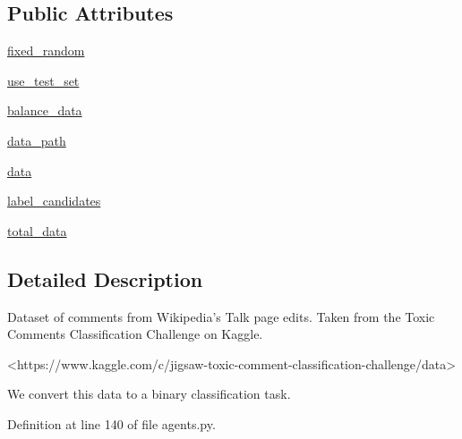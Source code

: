 \subsection*{Public Attributes}
\begin{DoxyCompactItemize}
\item 
\hyperlink{classparlai_1_1tasks_1_1dialogue__safety_1_1agents_1_1WikiToxicCommentsTeacher_a0a82908d2bd950c6bc497f6e095b06b7}{fixed\+\_\+random}
\item 
\hyperlink{classparlai_1_1tasks_1_1dialogue__safety_1_1agents_1_1WikiToxicCommentsTeacher_ad43ba64edd570e5fb5e4a4a0a68865cf}{use\+\_\+test\+\_\+set}
\item 
\hyperlink{classparlai_1_1tasks_1_1dialogue__safety_1_1agents_1_1WikiToxicCommentsTeacher_a9eeb881196ce42d8994dc4884fd9113a}{balance\+\_\+data}
\item 
\hyperlink{classparlai_1_1tasks_1_1dialogue__safety_1_1agents_1_1WikiToxicCommentsTeacher_a004f00e27fe4d6f437edab31e99018f5}{data\+\_\+path}
\item 
\hyperlink{classparlai_1_1tasks_1_1dialogue__safety_1_1agents_1_1WikiToxicCommentsTeacher_acfbf40cbf6be048c6667f4712e1db5c3}{data}
\item 
\hyperlink{classparlai_1_1tasks_1_1dialogue__safety_1_1agents_1_1WikiToxicCommentsTeacher_a81bfea7e10ad4273964a26599dcce45d}{label\+\_\+candidates}
\item 
\hyperlink{classparlai_1_1tasks_1_1dialogue__safety_1_1agents_1_1WikiToxicCommentsTeacher_a027ef2d3141fc6e055b17f3ce7a3c7c5}{total\+\_\+data}
\end{DoxyCompactItemize}


\subsection{Detailed Description}
\begin{DoxyVerb}Dataset of comments from Wikipedia's Talk page edits. Taken from the Toxic Comments
Classification Challenge on Kaggle.

<https://www.kaggle.com/c/jigsaw-toxic-comment-classification-challenge/data>

We convert this data to a binary classification task.
\end{DoxyVerb}
 

Definition at line 140 of file agents.\+py.



